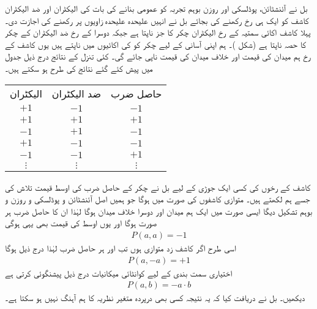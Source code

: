 بل نے آئنشٹائن،  پوڈلسکی اور روزن بوہم تجربہ کو عمومی بنانے کی بات کی الیکٹران اور ضد الیکٹران کاشف کو ایک ہی رخ رکھنے کی بجائے بل نے انہیں علیحدہ علیحدہ زاویوں پر رکھنے کی اجازت دی۔ پہلا کاشف اکائی سمتیہ   کے رخ الیکٹران چکر کا جز ناپتا ہے جبکہ دوسرا  کے رخ ضد الیکٹران کے چکر کا حصہ ناپتا ہے   (شکل )۔ ہم اپنی آسانی کے لیے چکر کو  کی اکائیوں میں ناپتے ہیں یوں کاشف کے رخ ہم میدان کی قیمت  اور خلاف میدان کی قیمت  ناپی جائے گی۔ کئی  تنزل کے نتائج درج ذیل جدول میں پیش کئے گئے نتائج کی طرح ہو سکتے ہیں۔
\begin{table}[h!]
\begin{center}
\begin{tabular}{|c c c|}
\hline
الیکٹران & ضد الیکٹران &حاصل  ضرب \\
$+1$ & $-1$ & $-1$ \\
$+1$ & $+1$ & $+1$ \\
$-1$ & $+1$ & $-1$ \\
$+1$ & $-1$ & $-1$ \\
$-1$ & $-1$ & $+1$ \\
$\vdots$ & $\vdots$ & $\vdots$ \\
\hline
\end{tabular}
\end{center}
\end{table}
کاشف کے رخوں کی کسی ایک جوڑی کے لیے بل نے چکر کے حاصل ضرب کی اوسط قیمت تلاش کی جسے ہم  لکھتے ہیں۔ متوازی کاشفوں کی صورت میں  ہوگا جو ہمیں اصل آئنشٹائن و  پوڈلسکی و  روزن و  بوہم تشکیل  دیگا ایسی صورت میں ایک ہم میدان اور دوسرا خلاف میدان ہوگا لہٰذا ان کا حاصل ضرب ہر صورت  ہوگا اور یوں اوسط کی قیمت بھی یہی ہوگی
\begin{align}
	P(a, a) = -1
\end{align}
اسی طرح اگر کاشف زد متوازی ہوں تب  اور ہر حاصل ضرب  لہٰذا درج ذیل ہوگا
\begin{align}
	P(a, -a) = +1
\end{align}
اختیاری سمت بندی کے لیے کوانٹائی  میکانیات درج ذیل پیشنگوئی  کرتی ہے
\begin{align}
	P(a, b) = -a\cdot b
\end{align}
 دیکھیں۔ بل نے دریافت کیا کہ یہ نتیجہ کسی بھی درپردہ متغیر نظریہ کا ہم آہنگ نہیں ہو سکتا ہے۔

